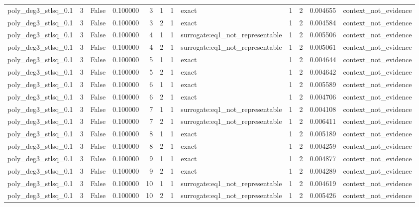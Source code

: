 \begin{tabular}{lrrrrrrlrrrl}
poly\_deg3\_stlsq\_0.1 & 3 & False & 0.100000 & 3 & 1 & 1 & exact & 1 & 2 & 0.004655 & context\_not\_evidence \\
poly\_deg3\_stlsq\_0.1 & 3 & False & 0.100000 & 3 & 2 & 1 & exact & 1 & 2 & 0.004584 & context\_not\_evidence \\
poly\_deg3\_stlsq\_0.1 & 3 & False & 0.100000 & 4 & 1 & 1 & surrogate:eq1\_not\_representable & 1 & 2 & 0.005506 & context\_not\_evidence \\
poly\_deg3\_stlsq\_0.1 & 3 & False & 0.100000 & 4 & 2 & 1 & surrogate:eq1\_not\_representable & 1 & 2 & 0.005061 & context\_not\_evidence \\
poly\_deg3\_stlsq\_0.1 & 3 & False & 0.100000 & 5 & 1 & 1 & exact & 1 & 2 & 0.004644 & context\_not\_evidence \\
poly\_deg3\_stlsq\_0.1 & 3 & False & 0.100000 & 5 & 2 & 1 & exact & 1 & 2 & 0.004642 & context\_not\_evidence \\
poly\_deg3\_stlsq\_0.1 & 3 & False & 0.100000 & 6 & 1 & 1 & exact & 1 & 2 & 0.005589 & context\_not\_evidence \\
poly\_deg3\_stlsq\_0.1 & 3 & False & 0.100000 & 6 & 2 & 1 & exact & 1 & 2 & 0.004706 & context\_not\_evidence \\
poly\_deg3\_stlsq\_0.1 & 3 & False & 0.100000 & 7 & 1 & 1 & surrogate:eq1\_not\_representable & 1 & 2 & 0.004108 & context\_not\_evidence \\
poly\_deg3\_stlsq\_0.1 & 3 & False & 0.100000 & 7 & 2 & 1 & surrogate:eq1\_not\_representable & 1 & 2 & 0.006411 & context\_not\_evidence \\
poly\_deg3\_stlsq\_0.1 & 3 & False & 0.100000 & 8 & 1 & 1 & exact & 1 & 2 & 0.005189 & context\_not\_evidence \\
poly\_deg3\_stlsq\_0.1 & 3 & False & 0.100000 & 8 & 2 & 1 & exact & 1 & 2 & 0.004259 & context\_not\_evidence \\
poly\_deg3\_stlsq\_0.1 & 3 & False & 0.100000 & 9 & 1 & 1 & exact & 1 & 2 & 0.004877 & context\_not\_evidence \\
poly\_deg3\_stlsq\_0.1 & 3 & False & 0.100000 & 9 & 2 & 1 & exact & 1 & 2 & 0.004289 & context\_not\_evidence \\
poly\_deg3\_stlsq\_0.1 & 3 & False & 0.100000 & 10 & 1 & 1 & surrogate:eq1\_not\_representable & 1 & 2 & 0.004619 & context\_not\_evidence \\
poly\_deg3\_stlsq\_0.1 & 3 & False & 0.100000 & 10 & 2 & 1 & surrogate:eq1\_not\_representable & 1 & 2 & 0.005426 & context\_not\_evidence \\

\end{tabular}

